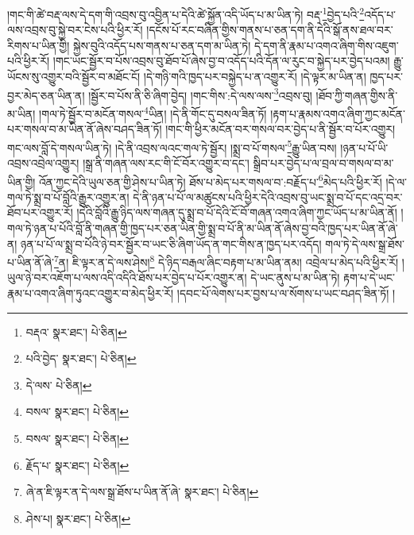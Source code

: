 །གང་གི་ཚེ་བརྡ་ལས་དེ་དག་གི་འབྲས་བུ་འབྱིན་པ་དེའི་ཚེ་སྐྱོན་འདི་ཡོད་པ་མ་ཡིན་ཏེ། བརྡ་\footnote{བརྡའ་  སྣར་ཐང་།  པེ་ཅིན། }བྱེད་པའི་\footnote{པའི་བྱེད་  སྣར་ཐང་།  པེ་ཅིན། }འདོད་པ་ལས་འབྲས་བུ་སྐྱེ་བར་ངེས་པའི་ཕྱིར་རོ། །དངོས་པོ་རང་བཞིན་གྱིས་གནས་པ་ཅན་དག་ནི་དེའི་སྒོ་ནས་ཐལ་བར་རིགས་པ་ཡིན་གྱི། སྐྱེས་བུའི་འདོད་པས་གནས་པ་ཅན་དག་མ་ཡིན་ཏེ། དེ་དག་ནི་རྣམ་པ་འགའ་ཞིག་གིས་འཇུག་པའི་ཕྱིར་རོ། །གང་ཡང་སྦྱོར་བ་པོས་འབྲས་བུ་ཐོབ་པོ་ཞེས་བྱ་བ་འདོད་པའི་དོན་ལ་རུང་བ་སྐྱེད་པར་བྱེད་པའམ། རྒྱུ་ཡོངས་སུ་འགྱུར་བའི་སྦྱོར་བ་མཐོང་ངོ། །དེ་གཉི་གའི་ཁྱད་པར་བསྐྱེད་པ་ན་འགྱུར་རོ། །དེ་ལྟར་མ་ཡིན་ན། ཁྱད་པར་བྱར་མེད་ཅན་ཡིན་ན། །སྦྱོར་བ་པོས་ནི་ཅི་ཞིག་བྱེད། །གང་གིས་:དེ་ལས་ལས་\footnote{དེ་ལས་  པེ་ཅིན། }འབྲས་བུ། །ཐོབ་ཀྱི་གཞན་གྱིས་ནི་མ་ཡིན། །གལ་ཏེ་སྦྱོར་བ་མངོན་གསལ་\footnote{བསལ་  སྣར་ཐང་།  པེ་ཅིན། }ཡིན། །དེ་ནི་གོང་དུ་བསལ་ཟིན་ཏོ། །རྟག་པ་རྣམས་འགའ་ཞིག་ཀྱང་མངོན་པར་གསལ་བ་མ་ཡིན་ནོ་ཞེས་བཤད་ཟིན་ཏོ། །གང་གི་ཕྱིར་མངོན་བར་གསལ་བར་བྱེད་པ་ནི་སྦྱོར་བ་པོར་འགྱུར། གང་ལས་བློ་དེ་གསལ་ཡིན་ཏེ། །དེ་ནི་འབྲས་ལའང་གལ་ཏེ་སྦྱོར། །སྨྲ་བ་པོ་གསལ་\footnote{བསལ་  སྣར་ཐང་།  པེ་ཅིན། }རྒྱུ་ཡིན་བས། །ཉན་པ་པོ་ཡི་འབྲས་འབྲེལ་འགྱུར། །སྒྲ་ནི་གཞན་ལས་རང་གི་ངོ་བོར་འགྱུར་བ་དང་། སྒྲིབ་པར་བྱེད་པ་ལ་བྲལ་བ་གསལ་བ་མ་ཡིན་གྱི། འོན་ཀྱང་དེའི་ཡུལ་ཅན་གྱི་ཤེས་པ་ཡིན་ཏེ། ཐོས་པ་མེད་པར་གསལ་བ་:བརྗོད་པ་\footnote{རྗོད་པ་  སྣར་ཐང་།  པེ་ཅིན། }མེད་པའི་ཕྱིར་རོ། །དེ་ལ་གལ་ཏེ་སྨྲ་བ་པོ་བློའི་རྒྱུར་འགྱུར་ན། དེ་ནི་ཉན་པ་པོ་ལ་མཚུངས་པའི་ཕྱིར་དེའི་འབྲས་བུ་ཡང་སྨྲ་བ་པོ་དང་འདྲ་བར་ཐོབ་པར་འགྱུར་རོ། །དེའི་བློའི་རྒྱུ་ཉིད་ལས་གཞན་དུ་སྨྲ་བ་པོ་དེའི་ངོ་བོ་གཞན་འགའ་ཞིག་ཀྱང་ཡོད་པ་མ་ཡིན་ནོ། །གལ་ཏེ་ཉན་པ་པོའི་བློ་ནི་གཞན་གྱི་ཁྱད་པར་ཅན་ཡིན་གྱི་སྨྲ་བ་པོ་ནི་མ་ཡིན་ནོ་ཞེས་བྱ་བའི་ཁྱད་པར་ཡིན་ནོ་ཞེ་ན། ཉན་པ་པོ་ལ་སྨྲ་བ་པོའི་ཉེ་བར་སྦྱོར་བ་ཡང་ཅི་ཞིག་ཡོད་ན་གང་གིས་ན་ཁྱད་པར་འདོད། གལ་ཏེ་དེ་ལས་སྒྲ་ཐོས་པ་ཡིན་ནོ་ཞེ་\footnote{ཞེ་ན་ཇི་ལྟར་ན་དེ་ལས་སྒྲ་ཐོས་པ་ཡིན་ནོ་ཞེ་  སྣར་ཐང་།  པེ་ཅིན། }ན། ཇི་ལྟར་ན་དེ་ལས་ཤེས།\footnote{ཤེས་པ།  སྣར་ཐང་།  པེ་ཅིན། } དེ་ཉིད་བརྒལ་ཞིང་བརྟག་པ་མ་ཡིན་ནམ། འབྲེལ་པ་མེད་པའི་ཕྱིར་རོ། །ཡུལ་ཉེ་བར་འཇོག་པ་ལས་འདི་འདིའི་ཐོས་པར་བྱེད་པ་པོར་འགྱུར་ན། དེ་ཡང་ནུས་པ་མ་ཡིན་ཏེ། རྟག་པ་དེ་ཡང་རྣམ་པ་འགའ་ཞིག་ཏུའང་འགྱུར་བ་མེད་ཕྱིར་རོ། །དབང་པོ་ལེགས་པར་བྱས་པ་ལ་སོགས་པ་ཡང་བཤད་ཟིན་ཏོ། །
